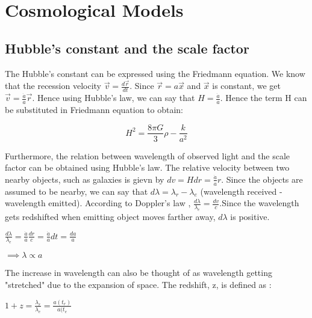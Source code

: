 \section{Cosmological Models}
\subsection{Hubble's constant and the scale factor}

The Hubble's constant can be expressed using the Friedmann equation. We know that the recession velocity $ \vec{v} = \frac{d\vec{r}}{dt} $. Since $ \vec{r}=a\vec{x} $ and $ \vec{x}$ is constant, we get $ \vec{v} = \frac{\dot{a}}{a}\vec{r} $. Hence using Hubble's law, we can say that $ H=\frac{\dot{a}}{a} $. Hence the term H can be substituted in Friedmann equation to obtain:

\begin{equation}
    H^2 = \frac{8{\pi}G}{3}\rho - \frac{k}{a^2}
\end{equation}

Furthermore, the relation between wavelength of observed light and the scale factor can be obtained using Hubble's law. The relative velocity between two nearby objects, such as galaxies is gievn by $dv = Hdr = \frac{\dot{a}}{a}r$. Since the objects are assumed to be nearby, we can say that $d\lambda = \lambda_{r}-\lambda_{e}$ (wavelength received - wavelength emitted). According to Doppler's law , $\frac{d\lambda}{\lambda_{e}} = \frac{dv}{c}$.Since the wavelength gets redshifted when emitting object moves farther away, ${d\lambda}$ is positive.

\begin{center}
\begin{math}
    \frac{d\lambda}{\lambda_{e}} = \frac{\dot{a}}{a}\frac{dr}{c} = \frac{\dot{a}}{a}dt = \frac{da}{a}
\end{math}
\end{center}


\begin{center}
    $\implies{\lambda \propto a}$
\end{center}

The increase in wavelength can also be thought of as wavelength getting "stretched" due to the expansion of space. The redshift, z, is defined as :

\begin{center}
    $1+z = \frac{\lambda_{r}}{\lambda_{e}} = \frac{a(t_r)}{a(t_e}$
\end{center}

